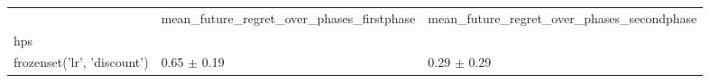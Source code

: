 \begin{tabular}{lll}
\toprule
 & mean_future_regret_over_phases_firstphase & mean_future_regret_over_phases_secondphase \\
hps &  &  \\
\midrule
frozenset({'lr', 'discount'}) & 0.65 $\pm$ 0.19 & 0.29 $\pm$ 0.29 \\
\bottomrule
\end{tabular}
